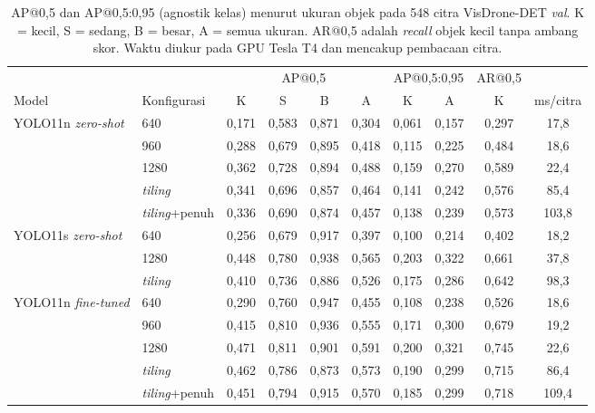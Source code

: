 \begin{table}[t]
\caption{AP@0,5 dan AP@0,5:0,95 (agnostik kelas) menurut ukuran objek pada 548 citra VisDrone-DET \textit{val}. K = kecil, S = sedang, B = besar, A = semua ukuran. AR@0,5 adalah \textit{recall} objek kecil tanpa ambang skor. Waktu diukur pada GPU Tesla T4 dan mencakup pembacaan citra.}
\label{tab:utama}
\centering\scriptsize
\begin{tabular}{llcccccccc}
\toprule
 & & \multicolumn{4}{c}{AP@0,5} & \multicolumn{2}{c}{AP@0,5:0,95} & AR@0,5 & \\
\cmidrule(lr){3-6}\cmidrule(lr){7-8}
Model & Konfigurasi & K & S & B & A & K & A & K & ms/citra \\
\midrule
YOLO11n \textit{zero-shot} & 640 & 0,171 & 0,583 & 0,871 & 0,304 & 0,061 & 0,157 & 0,297 & 17,8 \\
 & 960 & 0,288 & 0,679 & 0,895 & 0,418 & 0,115 & 0,225 & 0,484 & 18,6 \\
 & 1280 & 0,362 & 0,728 & 0,894 & 0,488 & 0,159 & 0,270 & 0,589 & 22,4 \\
 & \textit{tiling} & 0,341 & 0,696 & 0,857 & 0,464 & 0,141 & 0,242 & 0,576 & 85,4 \\
 & \textit{\textit{tiling}}+penuh & 0,336 & 0,690 & 0,874 & 0,457 & 0,138 & 0,239 & 0,573 & 103,8 \\
\midrule
YOLO11s \textit{zero-shot} & 640 & 0,256 & 0,679 & 0,917 & 0,397 & 0,100 & 0,214 & 0,402 & 18,2 \\
 & 1280 & 0,448 & 0,780 & 0,938 & 0,565 & 0,203 & 0,322 & 0,661 & 37,8 \\
 & \textit{tiling} & 0,410 & 0,736 & 0,886 & 0,526 & 0,175 & 0,286 & 0,642 & 98,3 \\
\midrule
YOLO11n \textit{fine-tuned} & 640 & 0,290 & 0,760 & 0,947 & 0,455 & 0,108 & 0,238 & 0,526 & 18,6 \\
 & 960 & 0,415 & 0,810 & 0,936 & 0,555 & 0,171 & 0,300 & 0,679 & 19,2 \\
 & 1280 & 0,471 & 0,811 & 0,901 & 0,591 & 0,200 & 0,321 & 0,745 & 22,6 \\
 & \textit{tiling} & 0,462 & 0,786 & 0,873 & 0,573 & 0,190 & 0,299 & 0,715 & 86,4 \\
 & \textit{\textit{tiling}}+penuh & 0,451 & 0,794 & 0,915 & 0,570 & 0,185 & 0,299 & 0,718 & 109,4 \\
\bottomrule
\end{tabular}
\end{table}
